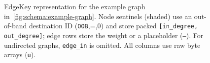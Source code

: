 \begin{figure}[t]
  \caption[EdgeKey representation for the example graph]{EdgeKey representation for the example graph in~\autoref{fig:schema:example-graph}. \colorbox{gray!15}{Node sentinels} (shaded) use an out-of-band destination ID (\texttt{OOB},=,0) and store packed \texttt{[in\_degree, out\_degree]};
  edge rows store the weight or a placeholder (\texttt{---}). For undirected graphs, \texttt{edge\_in} is omitted. All columns use raw byte arrays (\texttt{u}).}
  \label{fig:schema:edgekey}
\end{figure}
